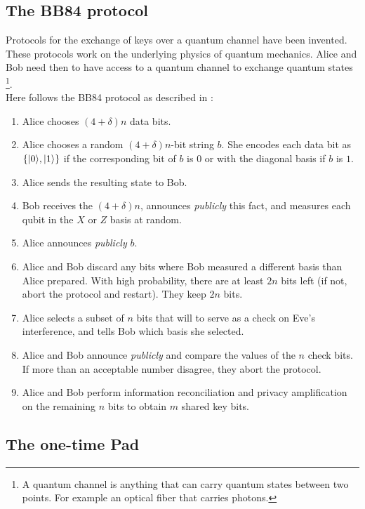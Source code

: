 	\subsection{The BB84 protocol}
	Protocols for the exchange of keys over a quantum channel have been invented.
	These protocols work on the underlying physics of quantum mechanics.
	Alice and Bob need then to have access to a quantum channel to exchange quantum states
	\footnote{A quantum channel is anything that can carry quantum states between two points. For example an optical fiber that carries photons.}.\\
	Here follows the BB84 protocol as described in \cite{NC10} :
		\begin{enumerate}
			\item Alice chooses $(4+\delta )n$ data bits.
			\item Alice chooses a random $(4+\delta )n$-bit string $b$. She encodes each data bit as $\{|0 \rangle,|1 \rangle\}$ if the corresponding bit of $b$ is $0$ or with the diagonal basis if $b$ is $1$.
			\item Alice sends the resulting state to Bob.
			\item Bob receives the $(4+\delta )n$, announces \emph{publicly} this fact, and measures each qubit in the $X$ or $Z$ basis at random.
			\item Alice announces \emph{publicly} $b$.
			\item Alice and Bob discard any bits where Bob measured a different basis than Alice prepared. With high probability, there are at least $2n$ bits left (if not, abort the protocol and restart). They keep $2n$ bits.
			\item Alice selects a subset of $n$ bits that will to serve as a check on Eve's interference, and tells Bob which basis she selected.
			\item Alice and Bob announce \emph{publicly} and compare the values of the $n$ check bits. If more than an acceptable number disagree, they abort the protocol.
			\item Alice and Bob perform information reconciliation and privacy amplification on the remaining $n$ bits to obtain $m$ shared key bits.
		\end{enumerate}

	\subsection{The one-time Pad}
		

